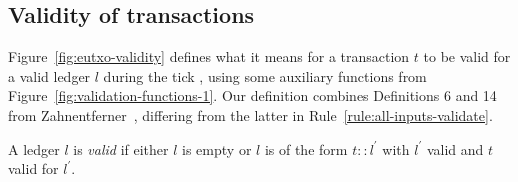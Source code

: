 \subsection{Validity of \EUTXO{} transactions}
\label{sec:eutxo-validity}

Figure~\ref{fig:eutxo-validity} defines what it means for a transaction $t$
to be valid for a valid ledger $l$ during the tick \currentTick, using some auxiliary functions from
Figure~\ref{fig:validation-functions-1}.
Our definition combines
Definitions 6 and 14 from Zahnentferner~\cite{Zahnentferner18-UTxO}, differing from
the latter in Rule~\ref{rule:all-inputs-validate}.

A ledger $l$ is \textit{valid} if either $l$ is empty or
$l$ is of the form $t::l^{\prime}$ with
$l^{\prime}$ valid and $t$ valid for $l^{\prime}$.
\vspace{-2mm}
